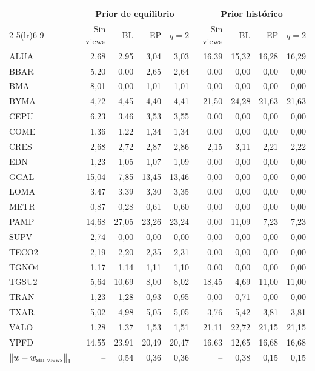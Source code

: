 \begin{tabular}{lrrrrrrrr}
\toprule
 & \multicolumn{4}{c}{Prior de equilibrio} & \multicolumn{4}{c}{Prior hist\'orico} \\
\cmidrule(lr){2-5}\cmidrule(lr){6-9}
 & Sin views & BL & EP & $q=2$ & Sin views & BL & EP & $q=2$ \\
\midrule
ALUA & 2{,}68 & 2{,}95 & 3{,}04 & 3{,}03 & 16{,}39 & 15{,}32 & 16{,}28 & 16{,}29 \\
BBAR & 5{,}20 & 0{,}00 & 2{,}65 & 2{,}64 & 0{,}00 & 0{,}00 & 0{,}00 & 0{,}00 \\
BMA & 8{,}01 & 0{,}00 & 1{,}01 & 1{,}01 & 0{,}00 & 0{,}00 & 0{,}00 & 0{,}00 \\
BYMA & 4{,}72 & 4{,}45 & 4{,}40 & 4{,}41 & 21{,}50 & 24{,}28 & 21{,}63 & 21{,}63 \\
CEPU & 6{,}23 & 3{,}46 & 3{,}53 & 3{,}55 & 0{,}00 & 0{,}00 & 0{,}00 & 0{,}00 \\
COME & 1{,}36 & 1{,}22 & 1{,}34 & 1{,}34 & 0{,}00 & 0{,}00 & 0{,}00 & 0{,}00 \\
CRES & 2{,}68 & 2{,}72 & 2{,}87 & 2{,}86 & 2{,}15 & 3{,}11 & 2{,}21 & 2{,}22 \\
EDN & 1{,}23 & 1{,}05 & 1{,}07 & 1{,}09 & 0{,}00 & 0{,}00 & 0{,}00 & 0{,}00 \\
GGAL & 15{,}04 & 7{,}85 & 13{,}45 & 13{,}46 & 0{,}00 & 0{,}00 & 0{,}00 & 0{,}00 \\
LOMA & 3{,}47 & 3{,}39 & 3{,}30 & 3{,}35 & 0{,}00 & 0{,}00 & 0{,}00 & 0{,}00 \\
METR & 0{,}87 & 0{,}28 & 0{,}61 & 0{,}60 & 0{,}00 & 0{,}00 & 0{,}00 & 0{,}00 \\
PAMP & 14{,}68 & 27{,}05 & 23{,}26 & 23{,}24 & 0{,}00 & 11{,}09 & 7{,}23 & 7{,}23 \\
SUPV & 2{,}74 & 0{,}00 & 0{,}00 & 0{,}00 & 0{,}00 & 0{,}00 & 0{,}00 & 0{,}00 \\
TECO2 & 2{,}19 & 2{,}20 & 2{,}35 & 2{,}31 & 0{,}00 & 0{,}00 & 0{,}00 & 0{,}00 \\
TGNO4 & 1{,}17 & 1{,}14 & 1{,}11 & 1{,}10 & 0{,}00 & 0{,}00 & 0{,}00 & 0{,}00 \\
TGSU2 & 5{,}64 & 10{,}69 & 8{,}00 & 8{,}02 & 18{,}45 & 4{,}69 & 11{,}00 & 11{,}00 \\
TRAN & 1{,}23 & 1{,}28 & 0{,}93 & 0{,}95 & 0{,}00 & 0{,}71 & 0{,}00 & 0{,}00 \\
TXAR & 5{,}02 & 4{,}98 & 5{,}05 & 5{,}05 & 3{,}76 & 5{,}42 & 3{,}81 & 3{,}81 \\
VALO & 1{,}28 & 1{,}37 & 1{,}53 & 1{,}51 & 21{,}11 & 22{,}72 & 21{,}15 & 21{,}15 \\
YPFD & 14{,}55 & 23{,}91 & 20{,}49 & 20{,}47 & 16{,}63 & 12{,}65 & 16{,}68 & 16{,}68 \\
\midrule
$\left\lVert w - w_{\text{sin views}} \right\rVert_1$ & -- & 0{,}54 & 0{,}36 & 0{,}36 & -- & 0{,}38 & 0{,}15 & 0{,}15 \\
\bottomrule
\end{tabular}
